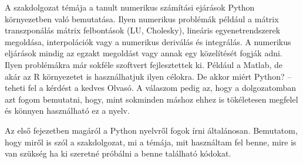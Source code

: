 
A szakdolgozat témája a tanult
numerikus számítási ejárások Python környezetben való bemutatása. Ilyen
numerikus problémák például a mátrix transzponálás mátrix felbontások
(LU, Cholesky), lineáris egyenetrendszerek megoldása, interpolációk vagy a numerikus deriválás és integrálás. A numerikus
eljárások mindig az egzakt megoldást vagy annak egy közelítését fogják adni.
Ilyen problémákra már sokféle szoftvert fejlesztettek ki. Például a
Matlab, de akár az R környezetet is használhatjuk ilyen célokra. De
akkor miért Python? -- teheti fel a kérdést a kedves Olvasó. A válaszom
pedig az, hogy a dolgozatomban azt fogom bemutatni, hogy, mint sokminden
máshoz ehhez is tökéletesen megfelel és könnyen használható ez a nyelv.

Az első fejezetben magáról a Python nyelvről fogok írni általánosan.
Bemutatom, hogy miről is szól a szakdolgozat, mi a témája, mit használtam fel benne,
mire is van szükség ha ki szeretné próbálni a benne található kódokat.
